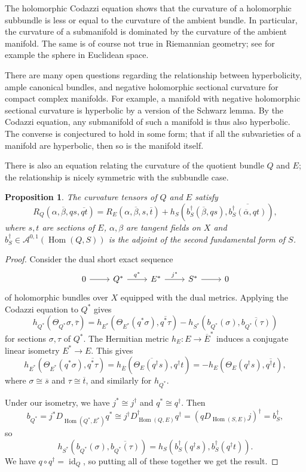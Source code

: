 \documentclass[11pt]{article}
\newtheorem{prop}[theo]{Proposition}
\newtheorem*{proof}{Proof}
\newcommand{\cc}[1]{\mathcal{#1}}
\def\ov#1{\overline{#1}}
\DeclareMathOperator{\Hom}{Hom}
\DeclareMathOperator{\id}{id}
\begin{document}
The holomorphic Codazzi equation shows that the curvature of a holomorphic subbundle is less or equal to the curvature of the ambient bundle. In particular, the curvature of a submanifold is dominated by the curvature of the ambient manifold. The same is of course not true in Riemannian geometry; see for example the sphere in Euclidean space.

There are many open questions regarding the relationship between hyperbolicity, ample canonical bundles, and negative holomorphic sectional curvature for compact complex manifolds. For example, a manifold with negative holomorphic sectional curvature is hyperbolic by a version of the Schwarz lemma. By the Codazzi equation, any submanifold of such a manifold is thus also hyperbolic. The converse is conjectured to hold in some form; that if all the subvarieties of a manifold are hyperbolic, then so is the manifold itself.

There is also an equation relating the curvature of the quotient bundle $Q$ and $E$; the relationship is nicely symmetric with the subbundle case.

\begin{prop}
The curvature tensors of $Q$ and $E$ satisfy
\[
R_Q(\alpha,\ov\beta,q s, \ov{q t})
= R_{E}(\alpha,\ov\beta,s,\ov t)
+ h_S(b_S^\dagger(\ov\beta,q s),\ov{ b_S^\dagger(\ov\alpha,q t)}),
\]
where $s, t$ are sections of $E$, $\alpha,\beta$ are tangent fields on
$X$ and $b_S^\dagger \in \cc A^{0,1}(\Hom(Q,S))$ is the adjoint of the second
fundamental form of $S$.
\end{prop}

\begin{proof}
Consider the dual short exact sequence
\[
\begin{tikzcd}
0 \arrow[r] & Q^* \arrow[r,"q^*"] & E^* \arrow[r,"j^*"]  & S^* \arrow[r] & 0
\end{tikzcd}
\]
of holomorphic bundles over $X$ equipped with the dual metrics.
Applying the Codazzi equation to $Q^*$ gives
$$
h_{Q^*}(\Theta_{Q^*} \sigma, \ov \tau)
= h_{E^*}(\Theta_{E^*} (q^* \sigma),\ov{ q^* \tau})
- h_{S^*}(b_{Q^*}(\sigma), \ov{b_{Q^*}(\tau)})
$$
for sections $\sigma,\tau$ of $Q^*$. The Hermitian metric $h_E : E \to \ov E^*$ induces a conjugate linear isometry $E^* \to E$. This gives
\[
h_{E^*}(\Theta_{E^*} (q^* \sigma),\ov{ q^* \tau})
= h_{\ov E}(\ov{\Theta_{E} (q^\dagger s)}, q^\dagger t)
= -h_{E}(\Theta_{E} (q^\dagger s), \ov{q^\dagger t}),
\]
where $\sigma \cong \ov s$ and $\tau \cong \ov t$,
and similarly for $h_{Q^*}$.

Under our isometry, we have $j^* \cong j^\dagger$ and $q^* \cong q^\dagger$. Then
\[
b_{Q^*}
= j^*D_{\Hom(Q^*,E^*)}q^*
\cong j^\dagger D_{\Hom(Q,E)}^\dagger q^\dagger
= (q D_{\Hom(S,E)} j)^\dagger
= b_S^\dagger,
\]
so
\[
h_{S^*}(b_{Q^*}(\sigma), \ov{b_{Q^*}(\tau)})
= h_{S}(b_S^\dagger(q^\dagger s), b_S^\dagger(q^\dagger t)).
\]
We have $q \circ q^\dagger = \id_Q$, so putting all of these together we get the result.
\end{proof}
\end{document}
